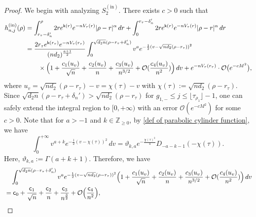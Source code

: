 \documentclass[reqno]{amsart}
\newcommand{\1}{\mathds{1}}
\numberwithin{equation}{section}
\theoremstyle{definition}
\begin{document}
\begin{proof}
We begin with analyzing $S_2^{(\mathrm{in})}$. 
There exists $c>0$ such that 
\begin{align}
\begin{split}
\label{def of hin rho 1}
h_{n,j}^{(\mathrm{in})}(\rho)
&=
\int_{r_{\tau}-\delta_n'}^{\rho}
2r e^{\mathsf{k}(r)}e^{-nV_{\tau}(r)}|\rho-r|^{\alpha}\,dr
+\int_{0}^{r_{\tau}-\delta_n'}
2r e^{\mathsf{k}(r)}e^{-nV_{\tau}(r)}|\rho-r|^{\alpha}\,dr
\\
&=
\frac{2r_{\tau}e^{\mathsf{k}(r_{\tau})}e^{-nV_{\tau}(r_{\tau})}}{(nd_2)^{\frac{a+1}{2}}}
\int_{0}^{\sqrt{d_2n}(\rho-r_{\tau}+\delta_n')}
v^{a}
e^{-\frac{1}{2}(v-\sqrt{nd_2}(\rho-r_{\tau}))^2}
\\
&\qquad\times
\Bigl( 
1+\frac{c_1(u_v)}{\sqrt{n}}+\frac{c_2(u_v)}{n}+\frac{c_3(u_v)}{n^{3/2}}+\mathcal{O}(\frac{c_4(u_v)}{n^2})
\Bigr)\,dv
+e^{-nV_{\tau}(r_{\tau})}\cdot\mathcal{O}\bigl(e^{-cM^2}\bigr), 
\end{split}
\end{align}
where $u_v=\sqrt{nd_2}(\rho-r_{\tau})-v=\chi(\tau)-v$ with $\chi(\tau):=\sqrt{nd_2}(\rho-r_{\tau})$.
Since $\sqrt{d_2n}(\rho-r_{\tau}+\delta_n')>\sqrt{nd_2}(\rho-r_{\tau})$ for $g_{1,-}\leq j\leq \lfloor \tau_{\rho_1}\rfloor-1$, one can safely extend the integral region to $[0,+\infty)$ with an error $\mathcal{O}(e^{-cM^2})$ for some $c>0$. 
Note that for $a> -1$ and $k\in\mathbb{Z}_{\geq 0}$, by \eqref{def of parabolic cylinder function}, we have 
\begin{equation}
\int_{0}^{+\infty}
v^{a+k}e^{-\frac{1}{2}(v-\chi(\tau))^2}\,dv
=
\vartheta_{k,a}
e^{-\frac{\chi(\tau)^2}{4}}D_{-a-k-1}(-\chi(\tau)). 
\end{equation}
Here, $\vartheta_{k,a}:=\Gamma(a+k+1)$.
Therefore, we have 
\begin{align}
\begin{split}
\label{def of hin rho 2}
&\quad 
\int_{0}^{\sqrt{d_2n}(\rho-r_{\tau}+\delta_n')}
v^{a}
e^{-\frac{1}{2}(v-\sqrt{nd_2}(\rho-r_{\tau}))^2}
\Bigl( 
1+\frac{c_1(u_v)}{\sqrt{n}}+\frac{c_2(u_v)}{n}+\frac{c_3(u_v)}{n^{3/2}}+\mathcal{O}(\frac{c_4(u_v)}{n^2})
\Bigr)\,dv
\\
&=
\mathsf{c}_0+\frac{\mathsf{c}_1}{\sqrt{n}}+\frac{\mathsf{c}_2}{n}+\frac{\mathsf{c}_3}{n^{\frac{3}{2}}}+\mathcal{O}\Bigl(\frac{\mathsf{c}_4}{n^2}\Bigr),
\end{split}

\end{align}
\end{proof}
\end{document}
